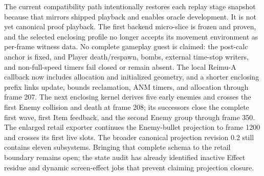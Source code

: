 The current compatibility path intentionally restores each replay stage
snapshot because that mirrors shipped playback and enables oracle development.
It is not yet canonical proof playback.  The first backend micro-slice is
frozen and proven, and the selected enclosing profile no longer accepts its
movement environment as per-frame witness data.  No complete gameplay guest is
claimed: the post-calc anchor is fixed, and Player death/respawn, bombs,
external time-stop writers, and non-full-speed timers fail closed or remain
  absent.  The local Reimu-A callback now includes allocation and initialized
geometry, and a shorter enclosing prefix links update, bounds reclamation, ANM
timers, and allocation through frame 207.  The next enclosing kernel derives
five early enemies and crosses the first Enemy collision and death at frame
208; its successors close the complete first wave, first Item feedback, and
the second Enemy group through frame 350.  The enlarged retail exporter
continues the Enemy-bullet projection to frame 1200 and crosses its first live
slots.  The broader canonical projection revision 0.2 still contains eleven
subsystems.  Bringing that complete schema to the retail boundary remains
open; the state audit has already identified inactive Effect residue and
dynamic screen-effect jobs that prevent claiming projection closure.
